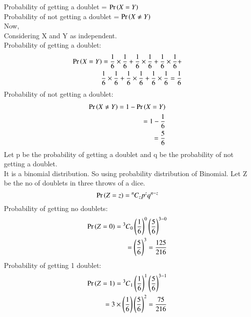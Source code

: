 \documentclass[journal,12pt,twocolumn]{IEEEtran}
\begin{document}
Probability of getting a doublet = $\pr{X=Y}$\\
Probability of not getting a doublet = $\pr{X\neq Y}$\\
Now, \\
    Considering X and Y as independent.\\
    Probability of getting a doublet:
    \begin{equation}
    \begin{split}
        \pr{X=Y} = \frac{1}{6} \times \frac{1}{6} + \frac{1}{6} \times \frac{1}{6} + \frac{1}{6} \times \frac{1}{6} +\\ \frac{1}{6} \times \frac{1}{6} + \frac{1}{6} \times \frac{1}{6} + \frac{1}{6} \times \frac{1}{6} 
        = \frac{1}{6}
    \end{split}
    \end{equation}
   Probability of not getting a doublet:
   \begin{equation}
   \begin{split}
       \pr{X\neq Y} = 1 - \pr{X=Y} \\
       = 1 - \frac{1}{6}\\
       = \frac{5}{6}
   \end{split}
   \end{equation}
Let p be the probability of getting a doublet and q be the probability of not getting a doublet.\\
It is a binomial distribution. So using probability distribution of Binomial. Let Z be the no of doublets in three throws of a dice.
    \begin{equation}
       \pr{Z=z} = \Mycomb[n]{z} p^z q^{n-z}
    \end{equation}
 Probability of getting no doublets:
 \begin{equation}
     \begin{split}
         \pr{Z=0} = \Mycomb[3]{0} \left(\frac{1}{6}\right)^0 \left(\frac{5}{6}\right)^{3-0}\\
         = \left(\frac{5}{6}\right)^3
         = \frac{125}{216}
     \end{split}
 \end{equation}
 Probability of getting 1 doublet:
 \begin{equation}
     \begin{split}
         \pr{Z=1} = \Mycomb[3]{1} \left(\frac{1}{6}\right)^1 \left(\frac{5}{6}\right)^{3-1}\\
         = 3 \times \left(\frac{1}{6}\right)\left(\frac{5}{6}\right)^2
         = \frac{75}{216}
     \end{split}
 \end{equation}
\end{document}
